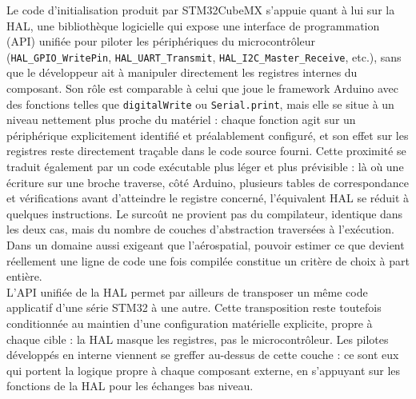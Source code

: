 Le code d'initialisation produit par STM32CubeMX s'appuie quant à lui sur la \acrfull{HAL}, une bibliothèque logicielle qui
expose une interface de programmation (\acrshort{API}) unifiée pour piloter les périphériques du microcontrôleur
(\texttt{HAL\_GPIO\_WritePin}, \texttt{HAL\_UART\_Transmit}, \texttt{HAL\_I2C\_Master\_Receive}, etc.), sans que le développeur
ait à manipuler directement les registres internes du composant. Son rôle est comparable à celui que joue le framework Arduino
avec des fonctions telles que \texttt{digitalWrite} ou \texttt{Serial.print}, mais elle se situe à un niveau nettement plus
proche du matériel : chaque fonction agit sur un périphérique explicitement identifié et préalablement configuré, et son effet
sur les registres reste directement traçable dans le code source fourni. Cette proximité se traduit également par un code
exécutable plus léger et plus prévisible : là où une écriture sur une broche traverse, côté Arduino, plusieurs tables de
correspondance et vérifications avant d'atteindre le registre concerné, l'équivalent \acrshort{HAL} se réduit à quelques
instructions. Le surcoût ne provient pas du compilateur, identique dans les deux cas, mais du nombre de couches d'abstraction
traversées à l'exécution. Dans un domaine aussi exigeant que l'aérospatial, pouvoir estimer ce que devient réellement une ligne
de code une fois compilée constitue un critère de choix à part entière.\\

L'\acrshort{API} unifiée de la \acrshort{HAL} permet par ailleurs de transposer un même code applicatif d'une série STM32 à une
autre. Cette transposition reste toutefois conditionnée au maintien d'une configuration matérielle explicite, propre à chaque
cible : la \acrshort{HAL} masque les registres, pas le microcontrôleur. Les pilotes développés en interne viennent se greffer
au-dessus de cette couche : ce sont eux qui portent la logique propre à chaque composant externe, en s'appuyant sur les fonctions
de la \acrshort{HAL} pour les échanges bas niveau.

\newpage

